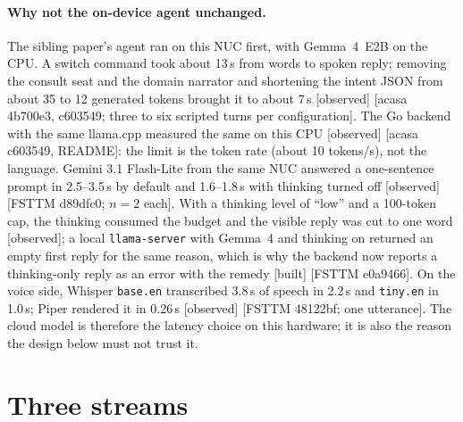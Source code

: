 \documentclass[11pt]{article}
\newcommand{\src}[1]{{\footnotesize\textsf{[#1]}}}
\newcommand{\built}{\textsf{\small[built]}}
\newcommand{\observed}{\textsf{\small[observed]}}
\begin{document}
\paragraph{Why not the on-device agent unchanged.} The sibling paper's agent ran on this NUC
first, with Gemma~4~E2B on the CPU. A switch command took about 13\,s from words to spoken
reply; removing the consult seat and the domain narrator and shortening the intent JSON from
about 35 to 12 generated tokens brought it to about 7\,s \observed{} \src{acasa 4b700e3,
c603549; three to six scripted turns per configuration}. The Go backend with the same llama.cpp
measured the same on this CPU \observed{} \src{acasa c603549, README}: the limit is the
token rate (about 10 tokens/s), not the language. Gemini 3.1 Flash-Lite from the same NUC
answered a one-sentence prompt in 2.5--3.5\,s by default and 1.6--1.8\,s with thinking turned
off \observed{} \src{FSTTM d89dfc0; $n=2$ each}. With a thinking level of ``low'' and a
100-token cap, the thinking consumed the budget and the visible reply was cut to one word
\observed; a local \texttt{llama-server} with Gemma~4 and thinking on returned an empty first
reply for the same reason, which is why the backend now reports a thinking-only reply as an
error with the remedy \built{} \src{FSTTM e0a9466}. On the voice side, Whisper \texttt{base.en}
transcribed 3.8\,s of speech in 2.2\,s and \texttt{tiny.en} in 1.0\,s; Piper rendered it in
0.26\,s \observed{} \src{FSTTM 48122bf; one utterance}. The cloud model is therefore the
latency choice on this hardware; it is also the reason the design below must not trust it.

\section{Three streams}\label{sec:streams}
\end{document}
